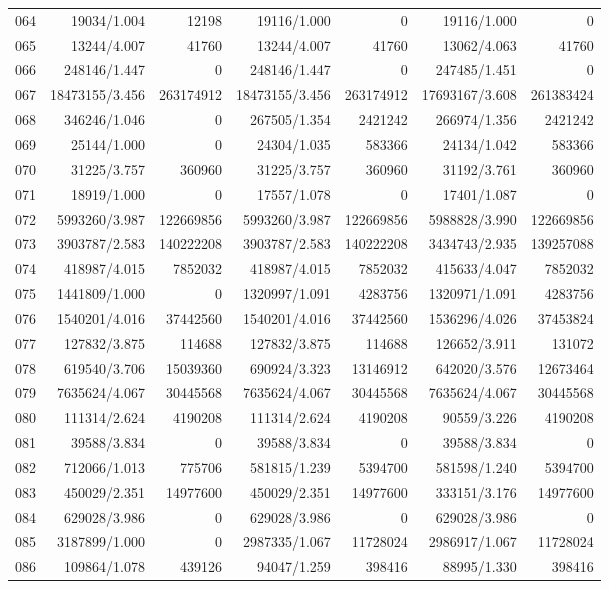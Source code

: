 \begin{longtable}{crrrrrr}
064 & 19034/1.004 & 12198 & 19116/1.000 & 0 & 19116/1.000 & 0 \\
065 & 13244/4.007 & 41760 & 13244/4.007 & 41760 & 13062/4.063 & 41760 \\
066 & 248146/1.447 & 0 & 248146/1.447 & 0 & 247485/1.451 & 0 \\
067 & 18473155/3.456 & 263174912 & 18473155/3.456 & 263174912 & 17693167/3.608 & 261383424 \\
068 & 346246/1.046 & 0 & 267505/1.354 & 2421242 & 266974/1.356 & 2421242 \\
069 & 25144/1.000 & 0 & 24304/1.035 & 583366 & 24134/1.042 & 583366 \\
070 & 31225/3.757 & 360960 & 31225/3.757 & 360960 & 31192/3.761 & 360960 \\
071 & 18919/1.000 & 0 & 17557/1.078 & 0 & 17401/1.087 & 0 \\
072 & 5993260/3.987 & 122669856 & 5993260/3.987 & 122669856 & 5988828/3.990 & 122669856 \\
073 & 3903787/2.583 & 140222208 & 3903787/2.583 & 140222208 & 3434743/2.935 & 139257088 \\
074 & 418987/4.015 & 7852032 & 418987/4.015 & 7852032 & 415633/4.047 & 7852032 \\
075 & 1441809/1.000 & 0 & 1320997/1.091 & 4283756 & 1320971/1.091 & 4283756 \\
076 & 1540201/4.016 & 37442560 & 1540201/4.016 & 37442560 & 1536296/4.026 & 37453824 \\
077 & 127832/3.875 & 114688 & 127832/3.875 & 114688 & 126652/3.911 & 131072 \\
078 & 619540/3.706 & 15039360 & 690924/3.323 & 13146912 & 642020/3.576 & 12673464 \\
079 & 7635624/4.067 & 30445568 & 7635624/4.067 & 30445568 & 7635624/4.067 & 30445568 \\
080 & 111314/2.624 & 4190208 & 111314/2.624 & 4190208 & 90559/3.226 & 4190208 \\
081 & 39588/3.834 & 0 & 39588/3.834 & 0 & 39588/3.834 & 0 \\
082 & 712066/1.013 & 775706 & 581815/1.239 & 5394700 & 581598/1.240 & 5394700 \\
083 & 450029/2.351 & 14977600 & 450029/2.351 & 14977600 & 333151/3.176 & 14977600 \\
084 & 629028/3.986 & 0 & 629028/3.986 & 0 & 629028/3.986 & 0 \\
085 & 3187899/1.000 & 0 & 2987335/1.067 & 11728024 & 2986917/1.067 & 11728024 \\
086 & 109864/1.078 & 439126 & 94047/1.259 & 398416 & 88995/1.330 & 398416 \\

\end{longtable}
